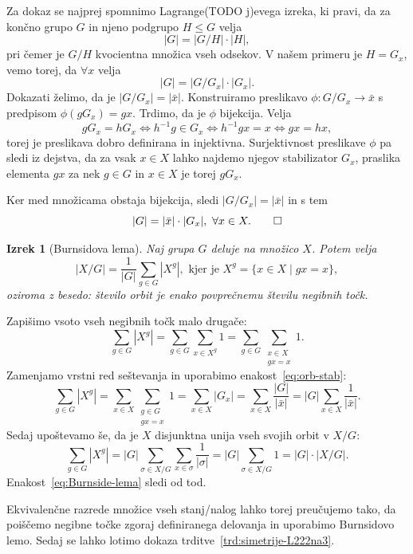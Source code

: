 \documentclass[12pt,a4paper]{amsart}
\theoremstyle{definition} %
\theoremstyle{plain} %
\newtheorem{izrek}[definicija]{Izrek}
\begin{document}
\proof
    Za dokaz se najprej spomnimo Lagrange(TODO j)evega izreka, ki pravi, da za končno grupo $G$ in njeno podgrupo $H \leq G$ velja
    \[ |G| = |G/H| \cdot |H|, \]
    pri čemer je $G/H$ kvocientna množica vseh odsekov.
    V našem primeru je $H = G_x$, vemo torej, da $\forall x$ velja
    \[ |G| = |G/G_x| \cdot |G_x|. \]
    Dokazati želimo, da je $|G/G_x| = |\bar{x}|.$ Konstruiramo preslikavo $\phi \colon G/G_x \rightarrow \bar{x}$ s predpisom $\phi(gG_x) = gx$. Trdimo, da je $\phi$ bijekcija. Velja
    \[ gG_x=hG_x \iff h^{-1}g \in G_x \iff h^{-1}gx=x \iff gx=hx, \]
    torej je preslikava dobro definirana in injektivna. Surjektivnost preslikave $\phi$ pa sledi iz dejstva, da za vsak $x \in X$ lahko najdemo njegov stabilizator $G_x$, praslika elementa $gx$ za nek $g \in G$ in $x \in X$ je torej $gG_x$. 
    
    Ker med množicama obstaja bijekcija, sledi $|G/G_x| = |\bar{x}|$ in s tem
    \[ |G| = |\bar{x}| \cdot |G_x|,\ \forall x \in X. \qedhere \]
\endproof

\begin{izrek}[Burnsidova lema]
    Naj grupa $G$ deluje na množico $X$. Potem velja
    \begin{equation}
        |X/G| = \frac{1}{|G|} \sum_{g \in G} |X^g|,\text{ kjer je } X^g=\{ x \in X \mid gx = x \},
        \label{eq:Burnside-lema}
    \end{equation}
    oziroma z besedo: število orbit je enako povprečnemu številu negibnih točk.
\end{izrek}

\proof
    Zapišimo vsoto vseh negibnih točk malo drugače:
    \[
        \sum_{g \in G} |X^g| = \sum_{g \in G} \sum_{x \in X^g} 1 = \sum_{g \in G} \sum_{\substack{x \in X \\ gx = x}} 1.  
    \]
    Zamenjamo vrstni red seštevanja in uporabimo enakost~\eqref{eq:orb-stab}:
    \[
        \sum_{g \in G} |X^g| = \sum_{x \in X} \sum_{\substack{g \in G \\ gx = x}} 1 = 
        \sum_{x \in X} |G_x| = \sum_{x \in X} \frac{|G|}{|\bar{x}|} = |G| \sum_{x \in X} \frac{1}{|\bar{x}|}.
    \]
    Sedaj upoštevamo še, da je $X$ disjunktna unija vseh svojih orbit v $X/G$:
    \[
        \sum_{g \in G} |X^g| = |G| \sum_{\sigma \in X/G} \sum_{x \in \sigma} \frac{1}{|\sigma|} = |G| \sum_{\sigma \in X/G} 1 = |G| \cdot |X/G|.
    \]
    Enakost~\eqref{eq:Burnside-lema} sledi od tod.
\endproof

Ekvivalenčne razrede množice vseh stanj/nalog lahko torej preučujemo tako, da poiščemo negibne točke zgoraj definiranega delovanja in uporabimo Burnsidovo lemo. Sedaj se lahko lotimo dokaza trditve~\ref{trd:simetrije-L222na3}.
\end{document}
